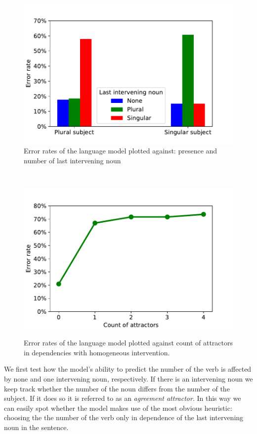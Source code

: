 \documentclass[11pt,a4paper]{article}
\begin{document}
    \begin{figure}
    \centering
        \includegraphics[scale=0.5]{2b.pdf}
            	\caption{Error rates of the language model plotted against: presence and number of last intervening noun}
        \label{fig:2b}
    \end{figure}
    ~ %
    \begin{figure}
    \centering
        \includegraphics[scale=0.5]{2c.pdf}
        \label{fig:2c}
            \caption{Error rates of the language model plotted against count of attractors in dependencies with homogeneous intervention.}
    \end{figure}

We first test how the model's ability to predict the number of the verb is affected by none and one intervening noun, respectively. If there is an intervening noun we keep track whether the number of the noun differs from the number of the subject. If it does so it is referred to as an \textit{agreement attractor}. In this way we can easily spot whether the model makes use of the most obvious heuristic: choosing the the number of the verb only in dependence of the last intervening noun in the sentence.
\end{document}
